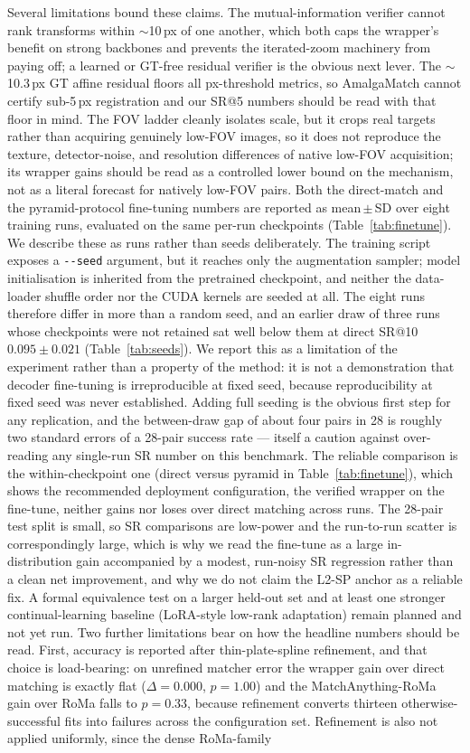 \documentclass[fleqn,10pt]{wlscirep}
\begin{document}
Several limitations bound these claims. The mutual-information verifier cannot rank transforms within $\sim$10\,px of one another, which both caps the wrapper's benefit on strong backbones and prevents the iterated-zoom machinery from paying off; a learned or GT-free residual verifier is the obvious next lever. The $\sim$10.3\,px GT affine residual floors all px-threshold metrics, so AmalgaMatch cannot certify sub-5\,px registration and our SR@5 numbers should be read with that floor in mind. The FOV ladder cleanly isolates scale, but it crops real targets rather than acquiring genuinely low-FOV images, so it does not reproduce the texture, detector-noise, and resolution differences of native low-FOV acquisition; its wrapper gains should be read as a controlled lower bound on the mechanism, not as a literal forecast for natively low-FOV pairs. Both the direct-match and the pyramid-protocol fine-tuning numbers are reported as mean\,$\pm$\,SD over eight training runs, evaluated on the same per-run checkpoints (Table~\ref{tab:finetune}). We describe these as runs rather than seeds deliberately. The training script exposes a \texttt{-{}-seed} argument, but it reaches only the augmentation sampler; model initialisation is inherited from the pretrained checkpoint, and neither the data-loader shuffle order nor the CUDA kernels are seeded at all. The eight runs therefore differ in more than a random seed, and an earlier draw of three runs whose checkpoints were not retained sat well below them at direct SR@10 $0.095\pm0.021$ (Table~\ref{tab:seeds}). We report this as a limitation of the experiment rather than a property of the method: it is not a demonstration that decoder fine-tuning is irreproducible at fixed seed, because reproducibility at fixed seed was never established. Adding full seeding is the obvious first step for any replication, and the between-draw gap of about four pairs in 28 is roughly two standard errors of a 28-pair success rate --- itself a caution against over-reading any single-run SR number on this benchmark. The reliable comparison is the within-checkpoint one (direct versus pyramid in Table~\ref{tab:finetune}), which shows the recommended deployment configuration, the verified wrapper on the fine-tune, neither gains nor loses over direct matching across runs. The 28-pair test split is small, so SR comparisons are low-power and the run-to-run scatter is correspondingly large, which is why we read the fine-tune as a large in-distribution gain accompanied by a modest, run-noisy SR regression rather than a clean net improvement, and why we do not claim the L2-SP anchor as a reliable fix. A formal equivalence test on a larger held-out set and at least one stronger continual-learning baseline (LoRA-style low-rank adaptation) remain planned and not yet run. Two further limitations bear on how the headline numbers should be read. First, accuracy is reported after thin-plate-spline refinement, and that choice is load-bearing: on unrefined matcher error the wrapper gain over direct matching is exactly flat ($\Delta=0.000$, $p=1.00$) and the MatchAnything-RoMa gain over RoMa falls to $p=0.33$, because refinement converts thirteen otherwise-successful fits into failures across the configuration set. Refinement is also not applied uniformly, since the dense RoMa-family 
\end{document}
